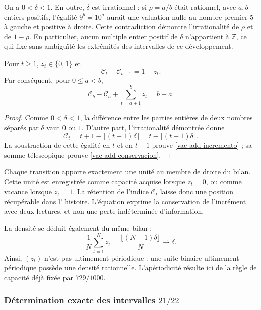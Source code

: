 On a \(0<\delta<1\). En outre, \(\delta\) est irrationnel : si \(\rho=a/b\) était rationnel, avec \(a,b\) entiers positifs, l'égalité \(9^b=10^a\) aurait une valuation nulle au nombre premier \(5\) à gauche et positive à droite. Cette contradiction démontre l'irrationalité de \(\rho\) et de \(1-\rho\). En particulier, aucun multiple entier positif de \(\delta\) n'appartient à \(\mathbb Z\), ce qui fixe sans ambiguïté les extrémités des intervalles de ce développement.

\begin{proposition}
\label{vac-add-balance}
Pour \(t\geq1\), \(z_t\in\{0,1\}\) et
\begin{equation}
 \mathcal C_t-\mathcal C_{t-1}=1-z_t.
 \label{vac-add-incremento}
\end{equation}
Par conséquent, pour \(0\leq a<b\),
\begin{equation}
 \mathcal C_b-\mathcal C_a+
 \sum_{t=a+1}^{b}z_t=b-a.
 \label{vac-add-conservacion}
\end{equation}
\end{proposition}
\begin{proof}
Comme \(0<\delta<1\), la différence entre les parties entières de deux
nombres séparés par \(\delta\) vaut \(0\) ou \(1\). D'autre part,
l'irrationalité démontrée donne
\[
 \mathcal C_t=t+1-\lceil(t+1)\delta\rceil
             =t-\lfloor(t+1)\delta\rfloor.
\]
La soustraction de cette égalité en \(t\) et en \(t-1\) prouve
\eqref{vac-add-incremento} ; sa somme télescopique prouve
\eqref{vac-add-conservacion}.
\end{proof}

Chaque transition apporte exactement une unité au membre de droite du
bilan. Cette unité est enregistrée comme capacité acquise lorsque
\(z_t=0\), ou comme vacance lorsque \(z_t=1\). La rétention de l'indice
\(\mathcal C_t\) laisse donc une position récupérable dans l'
histoire. L'équation exprime la conservation de l'incrément avec deux
lectures, et non une perte indéterminée d'information.

La densité se déduit également du même bilan :
\[
 \frac1N\sum_{t=1}^{N}z_t
 =\frac{\lfloor(N+1)\delta\rfloor}{N}\longrightarrow\delta.
\]
Ainsi, \((z_t)\) n'est pas ultimement périodique : une suite binaire
ultimement périodique possède une densité rationnelle. L'apériodicité
résulte ici de la règle de capacité déjà fixée par \(729/1000\).

\subsubsection{Détermination exacte des intervalles \(21/22\)}
\label{vac-add-primarios}


